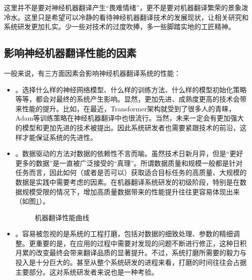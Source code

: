 \parinterval 这里并不是要对神经机器翻译产生``畏难情绪''，更不是要对机器翻译繁荣的景象泼冷水。这里只是希望可以冷静的看待神经机器翻译技术的发展现状，让相关研究和系统研发更加扎实。少一些对技术的过度吹捧，多一些脚踏实地的工匠精神。


\subsection{影响神经机器翻译性能的因素}
\parinterval 一般来说，有三方面因素会影响神经机器翻译系统的性能：

\begin{itemize}
\item {\small{}}。选择什么样的神经网络模型、什么样的训练方法、什么样的模型初始化策略等等，都会对最终的系统产生影响。显然，更加先进、成熟度更高的技术会带来性能的提升。比如，在最近，Transformer架构就受到了很多人的青睐，Adam等训练策略在神经机器翻译中也很流行。当然，未来一定会有更加强大的模型和更加先进的技术被提出。因此系统研发者也需要紧跟技术的前沿，这样才能保证系统的先进性。

\item {\small{}}。数据驱动的方法对数据的依赖性不言而喻。虽然技术日新月异，但是``更好更多的数据''是一直被广泛接受的``真理''。所谓数据质量和规模一般都是针对任务而言，因此如何（或者是否可以）获取适合目标任务的高质量、大规模的数据是实践中需要考虑的因素。在机器翻译系统研发的初级阶段，特别是在数据规模受限的情况下，增加高质量数据带来的性能提升往往更容易体现出来（如图\ref{fig:7-1}）。

\begin{figure}[htp]
\centering

\caption{机器翻译性能曲线}
\label{fig:7-1}
\end{figure}

\item {\small{}}。容易被忽视的是系统的工程打磨，包括对数据的细致处理、参数的精细调整。更重要的是，在应用的过程中需要对发现的问题不断进行修正，这种日积月累的改变最终会带来翻译品质的显著提升。不过，系统打磨所需要的毅力与投入是十分巨大的。甚至从整个系统研发的进程来看，打磨的时间往往会占据主要部分。这对系统研发者来说也是一种考验。
\end{itemize}


